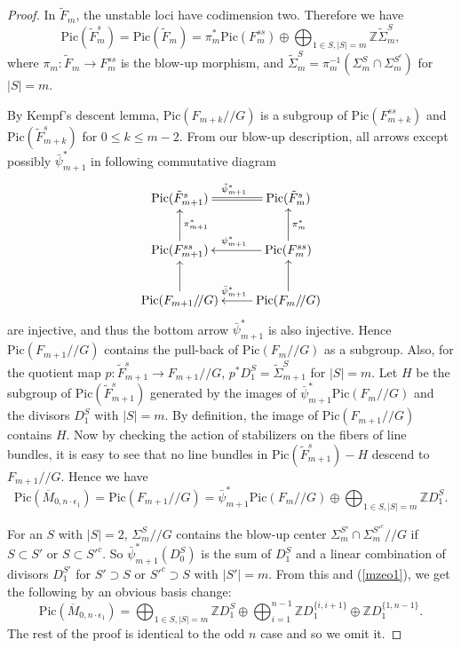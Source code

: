 \documentclass[10pt]{amsart}
\theoremstyle{definition}
\newcommand{\ZZ}{\mathbb{Z}}
\def\Mzeo{\overline{M}_{0,n\cdot \epsilon_1} }
\def\git{/\!/ }
\begin{document}
\begin{proof}
In $\tilde{F}_m$, the unstable loci have codimension two.
Therefore we have
\[
    \mathrm{Pic} (\tilde{F}_m^s) = \mathrm{Pic}(\tilde{F}_m)
    = \pi_m^* \mathrm{Pic} (F_m^{ss}) \oplus \bigoplus_{1 \in S, |S| = m}
    \ZZ \tilde{\Sigma}_m^S,
\]
where $\pi_m : \tilde{F}_m \to F_m^{ss}$ is the blow-up morphism,
and $\tilde{\Sigma}_m^S = \pi_m^{-1}(\Sigma_m^S \cap \Sigma_m^{S^c})$
for $|S|=m$.

By Kempf's descent lemma, $\mathrm{Pic}(F_{m+k}\git G)$ is a
subgroup of $\mathrm{Pic}(F_{m+k}^{ss})$ and
$\mathrm{Pic}(\tilde{F}_{m+k}^s)$ for $0 \le k \le m-2$. From our
blow-up description, all arrows except possibly
$\bar{\psi}_{m+1}^*$ in following commutative diagram
\[
    \xymatrix{\mathrm{Pic}(\tilde{F}_{m+1}^s)&
    \mathrm{Pic}(\tilde{F}_m^s)\ar@{=}[l]_{\tilde{\psi}_{m+1}^*}\\
    \mathrm{Pic}(F_{m+1}^{ss})\ar[u]_{\pi_{m+1}^*}&
    \mathrm{Pic}(F_m^{ss})\ar[l]_{\psi_{m+1}^*}\ar[u]_{\pi_m^*}\\
    \mathrm{Pic}(F_{m+1}\git G)\ar[u]&
    \mathrm{Pic}(F_m \git G)\ar[l]_{\bar{\psi}_{m+1}^*}\ar[u]}
\] are
injective, and thus the bottom arrow $\bar{\psi}_{m+1}^*$ is also
injective. Hence $\mathrm{Pic}(F_{m+1}\git G)$ contains the
pull-back of $\mathrm{Pic}(F_m \git G)$ as a subgroup. Also, for
the quotient map $p : \tilde{F}_{m+1}^s \to F_{m+1}\git G$, $p^*
D_1^S = \tilde{\Sigma}_{m+1}^S$ for $|S| = m$. Let $H$ be the
subgroup of $\mathrm{Pic}(\tilde{F}_{m+1}^s)$ generated by the
images of $\bar{\psi}_{m+1}^* \mathrm{Pic}(F_m \git G)$ and the
divisors $D_1^S$ with $|S| = m$. By definition, the image of
$\mathrm{Pic}(F_{m+1}\git G)$ contains $H$. Now by checking the
action of stabilizers on the fibers of line bundles, it is easy to
see that no line bundles in  $\mathrm{Pic}(\tilde{F}_{m+1}^s)- H$
descend to $F_{m+1}\git G$. Hence we have
\begin{equation}\label{mzeo1}
    \mathrm{Pic}(\Mzeo) = \mathrm{Pic}(F_{m+1} \git G)
    = \bar{\psi}_{m+1}^* \mathrm{Pic}(F_m \git G) \oplus
    \bigoplus_{1 \in S, |S| = m}\ZZ D_1^S.
\end{equation}

For an $S$ with $|S|=2$, $\Sigma_m^S\git G$ contains the blow-up
center $\Sigma_m^{S'} \cap \Sigma_m^{{S'}^c}\git G$ if $S \subset
S'$ or $S \subset {S'}^c$. So $\bar{\psi}_{m+1}^* (D_0^S)$ is the
sum of $D_{1}^S$ and a linear combination of divisors $D_1^{S'}$
for $S' \supset S$ or ${S'}^c\supset S$ with $|S'| = m$. From this
and (\ref{mzeo1}), we get the following by an obvious basis
change:
\[
    \mathrm{Pic}(\Mzeo) = \bigoplus_{1 \in S, |S| = m}\ZZ D_1^S
    \oplus \bigoplus_{i=1}^{n-1} \ZZ D_1^{\{i,i+1\}}
    \oplus \ZZ D_1^{\{1,n-1\}}.
\]
The rest of the proof is identical to the odd $n$ case and so we
omit it.
\end{proof}
\end{document}
